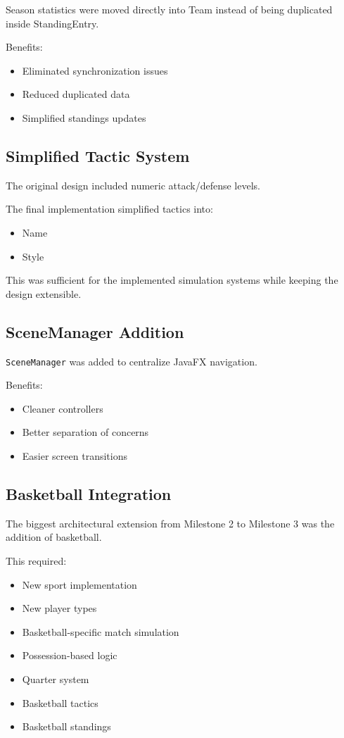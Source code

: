 \documentclass[11pt,a4paper]{article}
\begin{document}
Season statistics were moved directly into Team instead of being duplicated inside StandingEntry.

Benefits:
\begin{itemize}
\item Eliminated synchronization issues
\item Reduced duplicated data
\item Simplified standings updates
\end{itemize}

\subsection{Simplified Tactic System}

The original design included numeric attack/defense levels.

The final implementation simplified tactics into:
\begin{itemize}
\item Name
\item Style
\end{itemize}

This was sufficient for the implemented simulation systems while keeping the design extensible.

\subsection{SceneManager Addition}

\texttt{SceneManager} was added to centralize JavaFX navigation.

Benefits:
\begin{itemize}
\item Cleaner controllers
\item Better separation of concerns
\item Easier screen transitions
\end{itemize}

\subsection{Basketball Integration}

The biggest architectural extension from Milestone 2 to Milestone 3 was the addition of basketball.

This required:
\begin{itemize}
\item New sport implementation
\item New player types
\item Basketball-specific match simulation
\item Possession-based logic
\item Quarter system
\item Basketball tactics
\item Basketball standings
\end{itemize}
\end{document}
